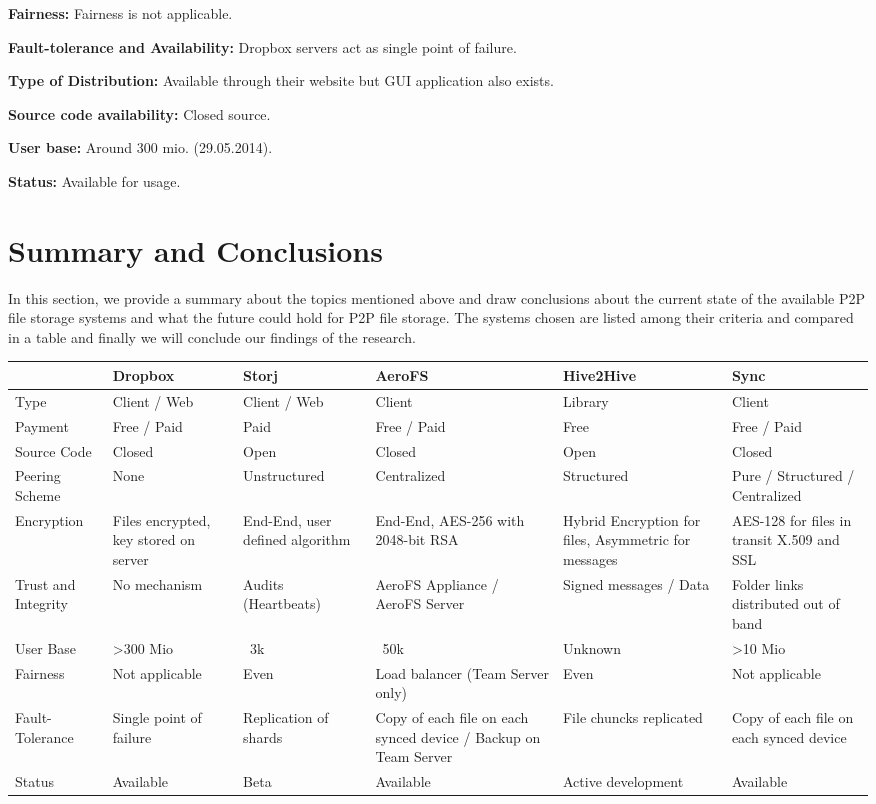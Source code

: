 \textbf{Fairness:} Fairness is not applicable.

\textbf{Fault-tolerance and Availability:} Dropbox servers act as single point of failure.

\textbf{Type of Distribution:} Available through their website but GUI application also exists.

\textbf{Source code availability:} Closed source.

\textbf{User base:} Around 300 mio. (29.05.2014)\cite{dropbox:userbase}.

\textbf{Status:} Available for usage.

\section{Summary and Conclusions}
In this section, we provide a summary about the topics mentioned above and draw conclusions about the current state of the available P2P file storage systems and what the future could hold for P2P file storage. The systems chosen are listed among their criteria and compared in a table and finally we will conclude our findings of the research.

\begin{table}
	\centering
		\begin{tabular}{ | *{6}{ p{2.5cm} |} }
			\hline
			& Dropbox & Storj & AeroFS & Hive2Hive & Sync \\ \hline
			Type & Client / Web & Client / Web & Client & Library & Client \\ \hline
			Payment & Free / Paid & Paid & Free / Paid & Free & Free / Paid \\ \hline
			Source Code & Closed & Open & Closed & Open & Closed \\ \hline
			Peering Scheme & None & Unstructured & Centralized & Structured & Pure / Structured / Centralized \\ \hline
			Encryption & Files encrypted, key stored on server & End-End, user defined algorithm & End-End, AES-256 with 2048-bit RSA & Hybrid Encryption for files, Asymmetric for messages & AES-128 for files in transit X.509 and SSL \\ \hline
			Trust and Integrity & No mechanism & Audits (Heartbeats) & AeroFS Appliance / AeroFS Server & Signed messages / Data & Folder links distributed out of band \\ \hline
			User Base & >300 Mio & ~3k & ~50k & Unknown & >10 Mio \\ \hline
			Fairness & Not applicable & Even & Load balancer (Team Server only) & Even & Not applicable \\ \hline
			Fault-Tolerance & Single point of failure & Replication of shards & Copy of each file on each synced device / Backup on Team Server & File chuncks replicated & Copy of each file on each synced device \\ \hline
			Status & Available & Beta & Available & Active development & Available \\ \hline
		\end{tabular}
\end{table}

